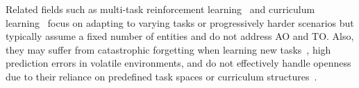 Related fields such as multi-task reinforcement learning~\cite{zhang2021survey} and curriculum learning~\cite{narvekar2020curriculum} focus on adapting to varying tasks or progressively harder scenarios but typically assume a fixed number of entities and do not address AO and TO.  Also, they may suffer from catastrophic forgetting when learning new tasks~\cite{ribeiro2019multitask}, high prediction errors in volatile environments, and do not effectively handle openness due to their reliance on predefined task spaces or curriculum structures~\cite{kravchenko2024limitations}. %






